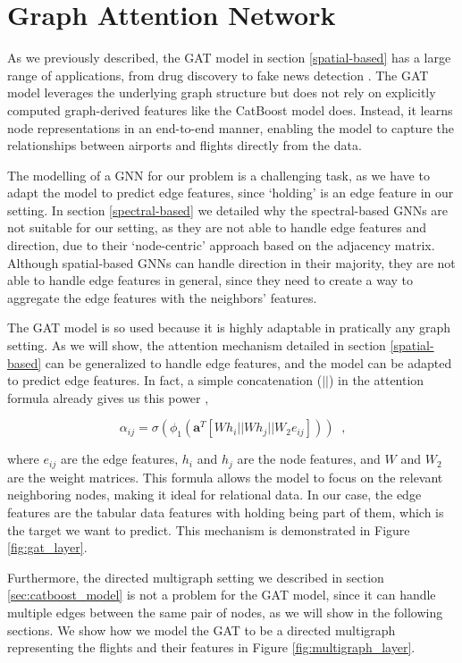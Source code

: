 \section[Graph Attention Network]{Graph Attention Network}
\label{Graph Attention Network}

As we previously described, the GAT model in section
\ref{spatial-based} has a large range of applications, from drug
discovery to fake news detection \cite{keywordsCaravanti}. The GAT
model leverages the underlying graph structure but does not rely on
explicitly computed graph-derived features like the CatBoost model
does. Instead, it learns node representations in an end-to-end manner,
enabling the model to capture the relationships between airports and
flights directly from the data.

The modelling of a GNN for our problem is a challenging task, as we
have to adapt the model to predict edge features, since `holding' is
an edge feature in our setting. In section \ref{spectral-based} we
detailed why the spectral-based GNNs are not suitable for our setting,
as they are not able to handle edge features and direction, due to
their `node-centric' approach based on the adjacency matrix. Although
spatial-based GNNs can handle direction in their majority, they are
not able to handle edge features in general, since they need to create
a way to aggregate the edge features with the neighbors' features.

The GAT model is so used because it is highly adaptable in pratically
any graph setting. As we will show, the attention mechanism detailed
in section \ref{spatial-based} can be generalized to handle edge
features, and the model can be adapted to predict edge features. In
fact, a simple concatenation ($ || $) in the attention formula already
gives us this power ,

$$ \alpha_{ij} = \sigma(\phi_1( \mathbf{a}^T [ W h_i || W h_j || W_2 e_{ij} ])) \; \; \text{,}$$

  where $e_{ij}$ are the edge features, $h_i$ and $h_j$ are the node
  features, and $W$ and $W_2$ are the weight matrices. This formula
  allows the model to focus on the relevant neighboring nodes, making
  it ideal for relational data. In our case, the edge features are the
  tabular data features with holding being part of them, which is the
  target we want to predict. This mechanism is demonstrated in Figure
  \ref{fig:gat_layer}.




Furthermore, the directed multigraph setting we described in section
\ref{sec:catboost_model} is not a problem for the GAT model, since it
can handle multiple edges between the same pair of nodes, as we will
show in the following sections. We show how we model the GAT to be a
directed multigraph representing the flights and their features in
Figure \ref{fig:multigraph_layer}.



